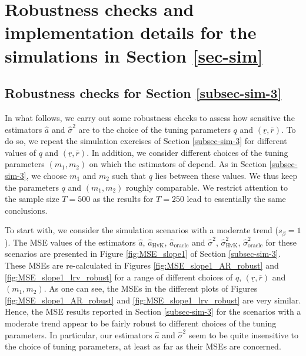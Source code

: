 
\section{Robustness checks and implementation details for the simulations in Section \ref{sec-sim}}\label{sec-supp-sim}


\subsection*{Robustness checks for Section \ref{subsec-sim-3}}


In what follows, we carry out some robustness checks to assess how sensitive the estimators $\widehat{a}$ and $\widehat{\sigma}^2$ are to the choice of the tuning parameters $q$ and $(\underline{r},\overline{r})$. To do so, we repeat the simulation exercises of Section \ref{subsec-sim-3} for different values of $q$ and $(\underline{r},\overline{r})$. In addition, we consider different choices of the tuning parameters $(m_1,m_2)$ on which the estimators of \cite{Hall2003} depend. As in Section \ref{subsec-sim-3}, we choose $m_1$ and $m_2$ such that $q$ lies between these values. We thus keep the parameters $q$ and $(m_1,m_2)$ roughly comparable. We restrict attention to the sample size $T=500$ as the results for $T=250$ lead to essentially the same conclusions. 


To start with, we consider the simulation scenarios with a moderate trend ($s_\beta = 1$). The MSE values of the estimators $\widehat{a}$, $\widehat{a}_{\text{HvK}}$, $\widehat{a}_{\text{oracle}}$ and $\widehat{\sigma}^2$, $\widehat{\sigma}^2_{\text{HvK}}$, $\widehat{\sigma}^2_{\text{oracle}}$ for these scenarios are presented in Figure \ref{fig:MSE_slope1} of Section \ref{subsec-sim-3}. These MSEs are re-calculated in Figures \ref{fig:MSE_slope1_AR_robust} and \ref{fig:MSE_slope1_lrv_robust} for a range of different choices of $q$, $(\underline{r},\overline{r})$ and $(m_1,m_2)$. As one can see, the MSEs in the different plots of Figures \ref{fig:MSE_slope1_AR_robust} and \ref{fig:MSE_slope1_lrv_robust} are very similar. Hence, the MSE results reported in Section \ref{subsec-sim-3} for the scenarios with a moderate trend appear to be fairly robust to different choices of the tuning parameters. In particular, our estimators $\widehat{a}$ and $\widehat{\sigma}^2$ seem to be quite insensitive to the choice of tuning parameters, at least as far as their MSEs are concerned.


